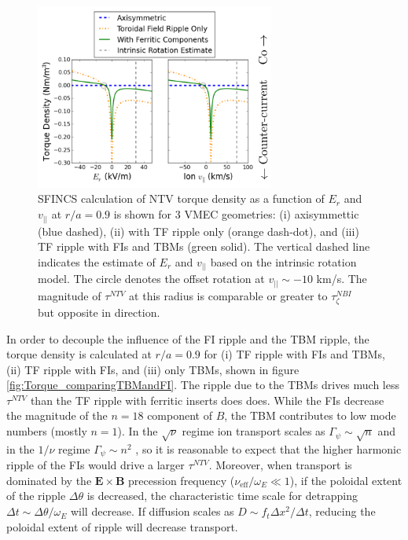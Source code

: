 \documentclass{article}
\begin{document}
\begin{figure}[h!]
\centering
\includegraphics[width=0.7\textwidth]{Torque_ErandV.png}
\caption{\label{fig:Torque_ErandV} SFINCS calculation of NTV torque density as a function of $E_r$ and $v_{||}$ at $r/a = 0.9$ is shown for 3 VMEC geometries: (i) axisymmettic (blue dashed), (ii) with TF ripple only (orange dash-dot), and (iii) TF ripple with FIs and TBMs (green solid). The vertical dashed line indicates the estimate of $E_r$ and $v_{||}$ based on the intrinsic rotation model. The circle denotes the offset rotation at $v_{||} \sim -10$ km/s. The magnitude of $\tau^{NTV}$ at this radius is comparable or greater to $\tau^{NBI}_{\zeta}$ but opposite in direction. }
\end{figure}

In order to decouple the influence of the FI ripple and the TBM ripple, the torque density is calculated at $r/a = 0.9$ for (i) TF ripple with FIs and TBMs, (ii) TF ripple with FIs, and (iii) only TBMs, shown in figure \ref{fig:Torque_comparingTBMandFI}. The ripple due to the TBMs drives much less $\tau^{NTV}$ than the TF ripple with ferritic inserts does does.  While the FIs decrease the magnitude of the $n = 18$ component of $B$, the TBM contributes to low mode numbers (mostly $n = 1$). In the $\sqrt{\nu}$ regime ion transport scales as $\Gamma_{\psi} \sim \sqrt{n}$ and in the $1/\nu$ regime $\Gamma_{\psi} \sim n^2$ \cite{Shaing2010}, so it is reasonable to expect that the higher harmonic ripple of the FIs would drive a larger $\tau^{NTV}$. Moreover, when transport is dominated by the $\bm{E} \times \bm{B}$ precession frequency ($\nu_{\text{eff}}/\omega_E \ll 1$), if the poloidal extent of the ripple $\Delta \theta$ is decreased, the characteristic time scale for detrapping $\Delta t \sim \Delta \theta/ \omega_E$ will decrease. If diffusion scales as $D \sim f_t \Delta x^2/\Delta t$, reducing the poloidal extent of ripple will decrease transport. 
\end{document}
